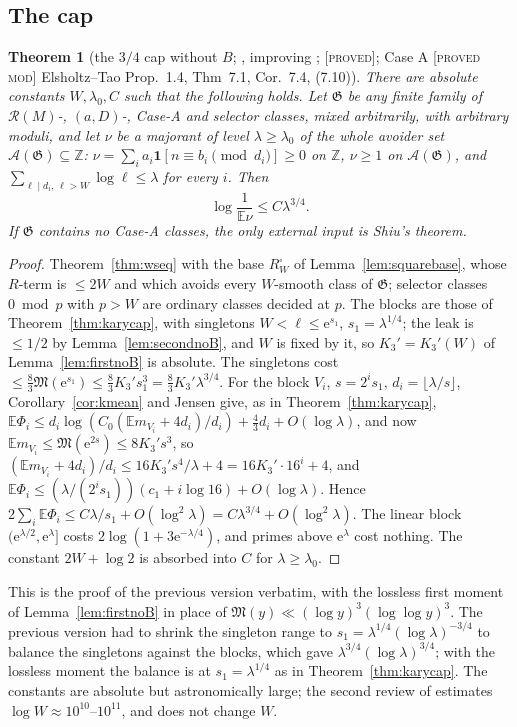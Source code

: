 \documentclass[10pt,reqno]{amsart}
\newtheorem{theorem}{Theorem}[section]
\theoremstyle{definition}
\theoremstyle{remark}
\newcommand{\A}{\mathcal A}
\newcommand{\cR}{\mathscr R}
\newcommand{\cG}{\mathfrak G}
\newcommand{\E}{\mathbb E}
\newcommand{\Z}{\mathbb Z}
\newcommand{\ind}{\mathbf 1}
\newcommand{\e}{\mathrm e}
\newcommand{\lab}[1]{\textup{[\textsc{#1}]}}
\begin{document}
\subsection{The cap}
\begin{theorem}[the $3/4$ cap without $B$; {\cite[Thm~4.1]{KA3}}, improving {\cite[Thm~5.1]{KA2}}; \lab{proved}; Case A \lab{proved mod} Elsholtz--Tao Prop.~1.4, Thm~7.1, Cor.~7.4, (7.10)]\label{thm:noBcap}
There are absolute constants $W,\lambda_0,C$ such that the following
holds.  Let $\cG$ be any finite family of $\cR(M)$-, $(a,D)$-, Case-A and
selector classes, mixed arbitrarily, with arbitrary moduli, and let $\nu$
be a majorant of level $\lambda\geq\lambda_0$ of the whole avoider set
$\A(\cG)\subseteq\Z$: $\nu=\sum_ia_i\ind[n\equiv b_i\pmod{d_i}]\geq0$ on $\Z$,
$\nu\geq1$ on $\A(\cG)$, and $\sum_{\ell\mid d_i,\,\ell>W}\log\ell\leq\lambda$ for
every $i$.  Then
\[
 \log\frac1{\E\nu}\leq C\lambda^{3/4}.
\]
If $\cG$ contains no Case-A classes, the only external input is Shiu's
theorem.
\end{theorem}
\begin{proof}
Theorem~\ref{thm:wseq} with the base $R_W^\square$ of
Lemma~\ref{lem:squarebase}, whose $R$-term is $\leq2W$ and which avoids
every $W$-smooth class of $\cG$; selector classes $0\bmod p$ with $p>W$
are ordinary classes decided at $p$.  The blocks are those of
Theorem~\ref{thm:karycap}, with singletons $W<\ell\leq\e^{s_1}$,
$s_1=\lambda^{1/4}$; the leak is $\leq1/2$ by
Lemma~\ref{lem:secondnoB}, and $W$ is fixed by it, so $K_3'=K_3'(W)$ of
Lemma~\ref{lem:firstnoB} is absolute.  The singletons cost
$\leq\frac83\mathfrak M(\e^{s_1})\leq\frac83K_3's_1^3=\frac83K_3'\lambda^{3/4}$.
For the block $V_i$, $s=2^is_1$, $d_i=\lfloor\lambda/s\rfloor$,
Corollary~\ref{cor:kmean} and Jensen give, as in
Theorem~\ref{thm:karycap},
$\E\Phi_i\leq d_i\log(C_0(\E m_{V_i}+4d_i)/d_i)+\frac43d_i+O(\log\lambda)$, and now
$\E m_{V_i}\leq\mathfrak M(\e^{2s})\leq8K_3's^3$, so
$(\E m_{V_i}+4d_i)/d_i\leq16K_3's^4/\lambda+4=16K_3'\cdot16^i+4$, and
$\E\Phi_i\leq(\lambda/(2^is_1))(c_1+i\log16)+O(\log\lambda)$.  Hence
$2\sum_i\E\Phi_i\leq C\lambda/s_1+O(\log^2\lambda)=C\lambda^{3/4}+O(\log^2\lambda)$.
The linear block $(\e^{\lambda/2},\e^\lambda]$ costs $2\log(1+3\e^{-\lambda/4})$, and primes
above $\e^\lambda$ cost nothing.  The constant $2W+\log2$ is absorbed into $C$
for $\lambda\geq\lambda_0$.
\end{proof}
This is the proof of the previous version \cite[Thm~5.1]{KA2} verbatim,
with the lossless first moment of Lemma~\ref{lem:firstnoB} in place of
$\mathfrak M(y)\ll(\log y)^3(\log\log y)^3$.  The previous version had to shrink
the singleton range to $s_1=\lambda^{1/4}(\log\lambda)^{-3/4}$ to balance the
singletons against the blocks, which gave $\lambda^{3/4}(\log\lambda)^{3/4}$; with
the lossless moment the balance is at $s_1=\lambda^{1/4}$ as in
Theorem~\ref{thm:karycap}.  The constants are absolute but astronomically
large; the second review of \cite{KA2} estimates $\log W\approx10^{10}$--$10^{11}$,
and \cite{KA3} does not change $W$.
\end{document}
